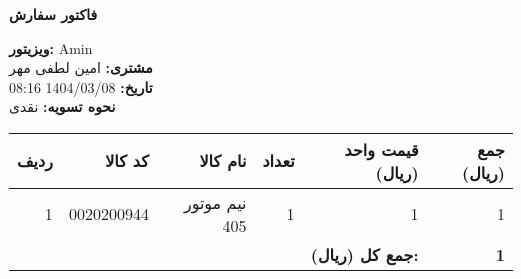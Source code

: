 \documentclass[a4paper,12pt]{article}
\begin{document}
        \begin{center}
            \textbf{\Large فاکتور سفارش}
        \end{center}
        \vspace{0.5cm}
        \begin{flushright}
            \textbf{ویزیتور:} Amin \\
            \textbf{مشتری:} امین لطفی مهر \\
            \textbf{تاریخ:} 1404/03/08 08:16 \\
            \textbf{نحوه تسویه:} نقدی
        \end{flushright}
        \vspace{0.5cm}
        \begin{longtable}{|r|r|r|r|r|r|}
            \hline
            \textbf{ردیف} & \textbf{کد کالا} & \textbf{نام کالا} & \textbf{تعداد} & \textbf{قیمت واحد (ریال)} & \textbf{جمع (ریال)} \\
            \hline
            \endhead
                    1 & 0020200944 & نيم موتور 405 & 1 & 1 & 1 \\
            \hline

            \hline
            \multicolumn{5}{|r|}{\textbf{جمع کل (ریال):}} & \textbf{ 1 } \\
            \hline
        \end{longtable}
        
\end{document}
